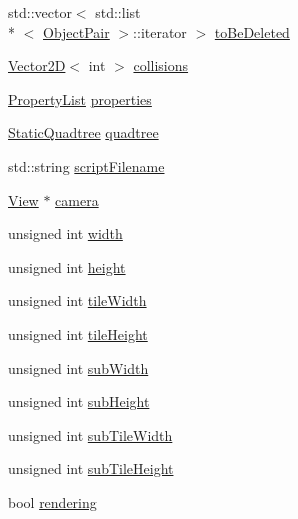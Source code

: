 \begin{DoxyCompactItemize}
\item 
std\+::vector$<$ std\+::list\\*
$<$ \hyperlink{classZeta_1_1Map_1_1ObjectPair}{Object\+Pair} $>$\+::iterator $>$ \hyperlink{classZeta_1_1Map_a5de1db4936f619768db7ee633eb0c696}{to\+Be\+Deleted}
\item 
\hyperlink{classZeta_1_1Vector2D}{Vector2\+D}$<$ int $>$ \hyperlink{classZeta_1_1Map_af6cc05c67e067a4b85bd54087875589d}{collisions}
\item 
\hyperlink{classZeta_1_1PropertyList}{Property\+List} \hyperlink{classZeta_1_1Map_a0ac3e5a50a5d64ab1f86fcf8b19dbd06}{properties}
\item 
\hyperlink{classZeta_1_1StaticQuadtree}{Static\+Quadtree} \hyperlink{classZeta_1_1Map_a7a9cabc93228166f370f5efaf80208fe}{quadtree}
\item 
std\+::string \hyperlink{classZeta_1_1Map_aa0e65da68b4d45da8c9c64104b85ef9d}{script\+Filename}
\item 
\hyperlink{classZeta_1_1View}{View} $\ast$ \hyperlink{classZeta_1_1Map_a9b9106c7c9476767a019f2a0a6a6e29b}{camera}
\item 
unsigned int \hyperlink{classZeta_1_1Map_abcd90abc2faf333eeedd81aa4c45853b}{width}
\item 
unsigned int \hyperlink{classZeta_1_1Map_aa28d08e860a10888d104dd06e662d2d9}{height}
\item 
unsigned int \hyperlink{classZeta_1_1Map_a7e857a9f55fc8afc4af291f55f5da0e0}{tile\+Width}
\item 
unsigned int \hyperlink{classZeta_1_1Map_a8199c841d1fee09ee6b334c4f2007eb0}{tile\+Height}
\item 
unsigned int \hyperlink{classZeta_1_1Map_ac3743d9eb646f17f80283a0a7d8a2ff7}{sub\+Width}
\item 
unsigned int \hyperlink{classZeta_1_1Map_a3c433d3e6f2b32b929d9bc83f6052ca0}{sub\+Height}
\item 
unsigned int \hyperlink{classZeta_1_1Map_a158ad62af3a54acc1d0ee072cc522462}{sub\+Tile\+Width}
\item 
unsigned int \hyperlink{classZeta_1_1Map_a729a5c62168e4e49d6096f54ee348ec8}{sub\+Tile\+Height}
\item 
bool \hyperlink{classZeta_1_1Map_a3a1da1a33ac12ed9d36fa0529705a1ba}{rendering}
\end{DoxyCompactItemize}


